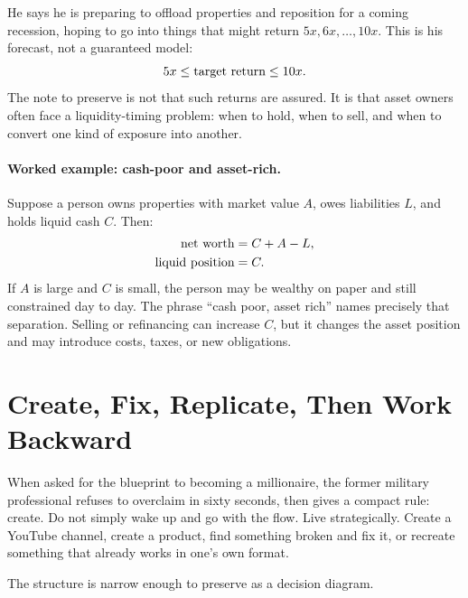 He says he is preparing to offload properties and reposition for a coming recession, hoping to go into things that might return \(5x,6x,\ldots,10x\). This is his forecast, not a guaranteed model:
\begin{equation}
5x \leq \hbox{target return} \leq 10x.
\end{equation}
The note to preserve is not that such returns are assured. It is that asset owners often face a liquidity-timing problem: when to hold, when to sell, and when to convert one kind of exposure into another.

\paragraph{Worked example: cash-poor and asset-rich.}
Suppose a person owns properties with market value \(A\), owes liabilities \(L\), and holds liquid cash \(C\). Then:
\begin{align}
\hbox{net worth} &= C + A - L,\\
\hbox{liquid position} &= C.
\end{align}
If \(A\) is large and \(C\) is small, the person may be wealthy on paper and still constrained day to day. The phrase ``cash poor, asset rich'' names precisely that separation. Selling or refinancing can increase \(C\), but it changes the asset position and may introduce costs, taxes, or new obligations.

\section{Create, Fix, Replicate, Then Work Backward}

When asked for the blueprint to becoming a millionaire, the former military professional refuses to overclaim in sixty seconds, then gives a compact rule: create. Do not simply wake up and go with the flow. Live strategically. Create a YouTube channel, create a product, find something broken and fix it, or recreate something that already works in one's own format.

The structure is narrow enough to preserve as a decision diagram.

